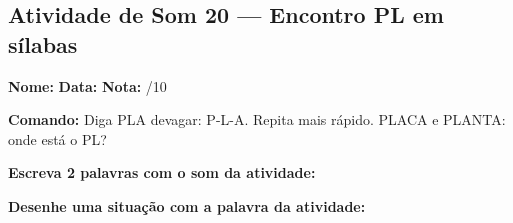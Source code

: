 \subsection{Atividade de Som 20 --- Encontro PL em sílabas}
\begin{exercicio}



\noindent\textbf{Nome:} \underline{\hspace{3.2cm}} \quad \textbf{Data:} \underline{\hspace{1.6cm}} \quad \textbf{Nota:} \underline{\hspace{0.9cm}}/10


\noindent\textbf{Comando:} Diga PLA devagar: P-L-A. Repita mais rápido. PLACA e PLANTA: onde está o PL?


\begin{center}
\end{center}

\noindent\textbf{Escreva 2 palavras com o som da atividade:}

\begin{center}
  \underline{\hspace{3cm}} \quad \underline{\hspace{3cm}}
\end{center}

\noindent\textbf{Desenhe uma situação com a palavra da atividade:}

\begin{center}
\end{center}

\end{exercicio}




